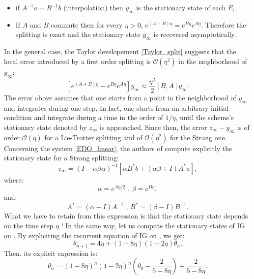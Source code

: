\begin{itemize}
	\item if $A^{-1}a=B^{-1}b$ (interpolation) then $y_{\infty}$ is the stationary state of each $F_i$.
	\item If $A$ and $B$ commute then for every $\eta>0$, $e^{(A+B)\eta}=e^{B\eta}e^{A\eta}$. Therefore the splitting is exact and the stationary state $y_{\infty}$ is recovered asymptotically. 
\end{itemize}
In the general case, the Taylor developement \eqref{Taylor_split} suggests that the local error introduced by a first order splitting is $\mathcal{O}(\eta^2)$ in the neighborhood of $y_{\infty}$:
\begin{equation*}
	\left[e^{(A+B)\eta}-e^{B\eta}e^{A\eta}\right]y_{\infty} \approx \frac{\eta^2}{2}\left[B,A\right]y_{\infty}.
\end{equation*}
The error above assumes that one starts from a point in the neighborhood of $y_{\infty}$ and integrates during one step. In fact, one starts from an arbitrary initial condition and
integrate during a time in the order of $1/\eta$, until the scheme's stationary state denoted by $z_{\infty}$ is approached. Since then, the error $z_{\infty}-y_{\infty}$ is of order $\mathcal{O}(\eta)$ for a Lie-Trotter splitting and of $\mathcal{O}(\eta^2)$ for the Strang one. Concerning the system \eqref{EDO_linear}, the authors of \cite{rebalanced_splitting} compute explicitly the stationary state for a Strang splitting:
\begin{equation*}
	z_{\infty} = (I-\alpha\beta\alpha)^{-1}\left[\alpha B^*b + (\alpha\beta+I)A^*a\right],
\end{equation*}
where:
\begin{equation*}
	\alpha = e^{A\eta/2} \text{ , } \beta = e^{B\eta},
\end{equation*}
and:
\begin{equation*}
	A^* = (\alpha-I)A^{-1} \text{ , } B^* = (\beta-I) B^{-1}.
\end{equation*}
What we have to retain from this expression is that the stationary state depends on the time step $\eta$ ! In the same way, let us compute the stationary states of IG on \exOne. By expliciting the recurrent equation of IG on \exOne, we get:
\begin{equation*}
	\theta_{n+1} = 4\eta + (1-8\eta)(1-2\eta)\theta_n.
\end{equation*} 
Then, its explicit expression is:
\begin{equation*}
	\theta_n = (1-8\eta)^n(1-2\eta)^n\left(\theta_0-\dfrac{2}{5-8\eta}\right) + \dfrac{2}{5-8\eta}.
\end{equation*}
